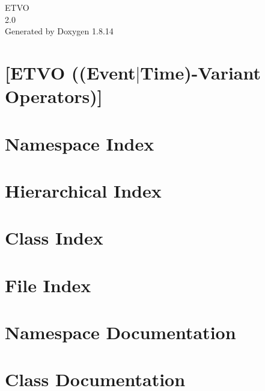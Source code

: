 \documentclass[twoside]{book}
\newcommand{\+}{\discretionary{\mbox{\scriptsize$\hookleftarrow$}}{}{}}
\newcommand{\clearemptydoublepage}{%
  \newpage{\pagestyle{empty}\cleardoublepage}%
}
\begin{document}
\begin{titlepage}
\vspace*{7cm}
\begin{center}%
{\Large E\+T\+VO \\[1ex]\large 2.\+0 }\\
\vspace*{1cm}
{\large Generated by Doxygen 1.8.14}\\
\end{center}
\end{titlepage}
\clearemptydoublepage
{}
\tableofcontents
\clearemptydoublepage
{}

\chapter{[E\+T\+VO ((Event$\vert$\+Time)-\/\+Variant Operators)]}
\label{index}
\chapter{Namespace Index}

\chapter{Hierarchical Index}

\chapter{Class Index}

\chapter{File Index}

\chapter{Namespace Documentation}


\chapter{Class Documentation}


































\end{document}
